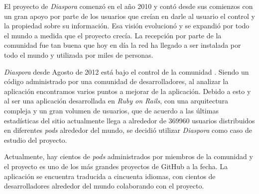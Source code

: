 El proyecto de \emph{Diaspora} comenzó en el año 2010 y contó desde sus comienzos con un gran apoyo por parte de los usuarios que creían en darle al usuario el control y la propiedad sobre su información. Esa visión evolucionó y se expandió por todo el mundo a medida que el proyecto crecía. La recepción por parte de la comunidad fue tan buena que hoy en día la red ha llegado a ser instalada por todo el mundo y utilizada por miles de personas.

\emph{Diaspora} desde Agosto de 2012 está bajo el control de la comunidad \cite{diasp_comunidad}. Siendo un código administrado por una comunidad de desarrolladores, al analizar la aplicación encontramos varios puntos a mejorar de la aplicación. Debido a esto y al ser una aplicación desarrollada en \emph{Ruby on Rails}, con una arquitectura compleja y un gran volumen de usuarios, que de acuerdo a las últimas estadísticas del sitio \cite{diasp_stats} actualmente llega a alrededor de 369960 usuarios distribuidos en diferentes \emph{pods} alrededor del mundo, se decidió utilizar \emph{Diaspora} como caso de estudio del proyecto.

Actualmente, hay cientos de \emph{pods} administrados por miembros de la comunidad y el proyecto es uno de los más grandes proyectos de GitHub a la fecha. La aplicación se encuentra traducida a cincuenta idiomas, con cientos de desarrolladores alrededor del mundo colaborando con el proyecto.



